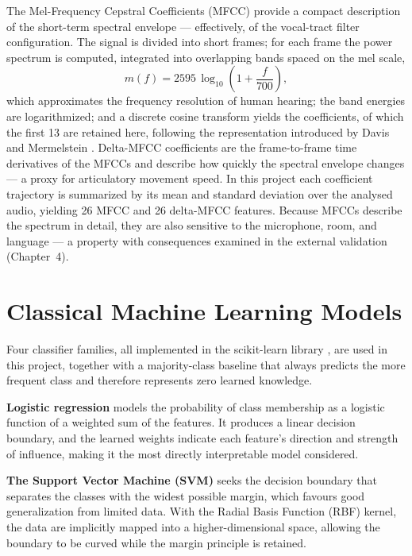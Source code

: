 The Mel-Frequency Cepstral Coefficients (MFCC) provide a compact
description of the short-term spectral envelope --- effectively, of the
vocal-tract filter configuration. The signal is divided into short
frames; for each frame the power spectrum is computed, integrated into
overlapping bands spaced on the mel scale,
\begin{equation}
m(f) = 2595\,\log_{10}\!\left(1+\frac{f}{700}\right),
\label{eq:mel}
\end{equation}
which approximates the frequency resolution of human hearing; the band
energies are logarithmized; and a discrete cosine transform yields the
coefficients, of which the first 13 are retained here, following the
representation introduced by Davis and Mermelstein \cite{davis1980}.
Delta-MFCC coefficients are the frame-to-frame time derivatives of the
MFCCs and describe how quickly the spectral envelope changes ---
a proxy for articulatory movement speed. In this project each
coefficient trajectory is summarized by its mean and standard deviation
over the analysed audio, yielding 26 MFCC and 26 delta-MFCC features.
Because MFCCs describe the spectrum in detail, they are also sensitive
to the microphone, room, and language --- a property with consequences
examined in the external validation (Chapter~4).

\section{Classical Machine Learning Models}

Four classifier families, all implemented in the scikit-learn library
\cite{pedregosa2011}, are used in this project, together with a
majority-class baseline that always predicts the more frequent class
and therefore represents zero learned knowledge.

\textbf{Logistic regression} models the probability of class
membership as a logistic function of a weighted sum of the features.
It produces a linear decision boundary, and the learned weights
indicate each feature's direction and strength of influence, making it
the most directly interpretable model considered.

\textbf{The Support Vector Machine (SVM)} \cite{cortes1995} seeks the
decision boundary that separates the classes with the widest possible
margin, which favours good generalization from limited data. With the
Radial Basis Function (RBF) kernel, the data are implicitly mapped into
a higher-dimensional space, allowing the boundary to be curved while
the margin principle is retained.

